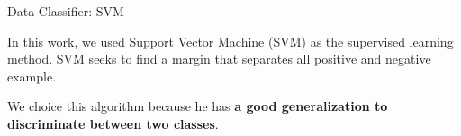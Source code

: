 \documentclass{beamer}
\begin{document}


\begin{frame}{Data Classifier: SVM}
\begin{block}{}
	In this work, we used Support Vector Machine (SVM) as the supervised learning method. SVM seeks to find a margin that separates all positive and negative example.
		
	We choice this algorithm because he has \textbf{a good generalization to discriminate between two classes}.
\end{block}
\end{frame}
\end{document}
